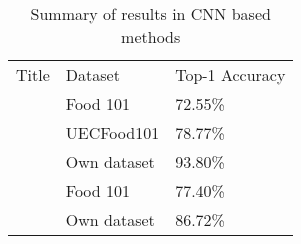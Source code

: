 \begin{table}[h]
	\centering
	\caption{Summary of results in CNN based methods}
	\label{cnn_summary}
	\begin{tabular}{lll}
		Title                                & Dataset     & Top-1 Accuracy \\
		\parencite{deepLearning} 			 & Food 101    & 72.55\%  \\
		\parencite{yanaiFood}               	 & UECFood101  & 78.77\%  \\
		\parencite{kagayaFood}       		 & Own dataset & 93.80\%   \\
		\parencite{deepFood}                  & Food 101    & 77.40\%  	\\
		\parencite{nutrinet}                  & Own dataset & 86.72\%
	\end{tabular}
\end{table}

